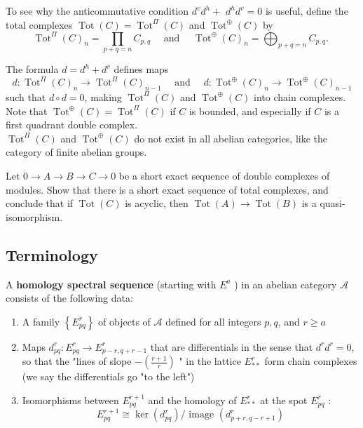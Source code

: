 To see why the anticommutative condition $d^v d^h+$ $d^h d^v=0$ is useful, define the total complexes $\operatorname{Tot}(C)=\operatorname{Tot}^{\Pi}(C)$ and $\operatorname{Tot}^{\oplus}(C)$ by
$$
\operatorname{Tot}^{\Pi}(C)_n=\prod_{p+q=n} C_{p, q} \quad \text { and } \quad \operatorname{Tot}^{\oplus}(C)_n=\bigoplus_{p+q=n} C_{p, q} \text {. }
$$

The formula $d=d^h+d^v$ defines maps
$$
d: \operatorname{Tot}^{\Pi}(C)_n \rightarrow \operatorname{Tot}^{\Pi}(C)_{n-1} \quad \text { and } \quad d: \operatorname{Tot}^{\oplus}(C)_n \rightarrow \operatorname{Tot}^{\oplus}(C)_{n-1}
$$
such that $d \circ d=0$, making $\operatorname{Tot}^{\Pi}(C)$ and $\operatorname{Tot}^{\oplus}(C)$ into chain complexes. Note that $\operatorname{Tot}^{\oplus}(C)=\operatorname{Tot}^{\Pi}(C)$ if $C$ is bounded, and especially if $C$ is a first quadrant double complex.\\ $\operatorname{Tot}^{\Pi}(C)$ and $\operatorname{Tot}^{\oplus}(C)$ do not exist in all abelian categories, like the category of finite abelian groups.

\begin{prop}
Let $0 \rightarrow A \rightarrow B \rightarrow C \rightarrow 0$ be a short exact sequence of double complexes of modules. Show that there is a short exact sequence of total complexes, and conclude that if $\operatorname{Tot}(C)$ is acyclic, then $\operatorname{Tot}(A) \rightarrow \operatorname{Tot}(B)$ is a quasi-isomorphism.
\end{prop}

\subsection{Terminology}

A \textbf{homology spectral sequence } (starting with $E^a$ ) in an abelian category $\mathcal{A}$ consists of the following data:
\begin{enumerate}
    \item 
    A family $\left\{E_{p q}^r\right\}$ of objects of $\mathcal{A}$ defined for all integers $p, q$, and $r \geq a$
    \item 
    Maps $d_{p q}^r: E_{p q}^r \rightarrow E_{p-r, q+r-1}^r$ that are differentials in the sense that $d^r d^r=0$, so that the "lines of slope $ \displaystyle - \left(\frac{r+1}{r}\right)$ " in the lattice $E_{* *}^r$ form chain complexes (we say the differentials go "to the left")
    \item 
    Isomorphisms between $E_{p q}^{r+1}$ and the homology of $E_{* *}^r$ at the spot $E_{p q}^r$ :
    $$
    E_{p q}^{r+1} \cong \operatorname{ker}\left(d_{p q}^r\right) / \text { image }\left(d_{p+r, q-r+1}^r\right)
    $$
\end{enumerate}

